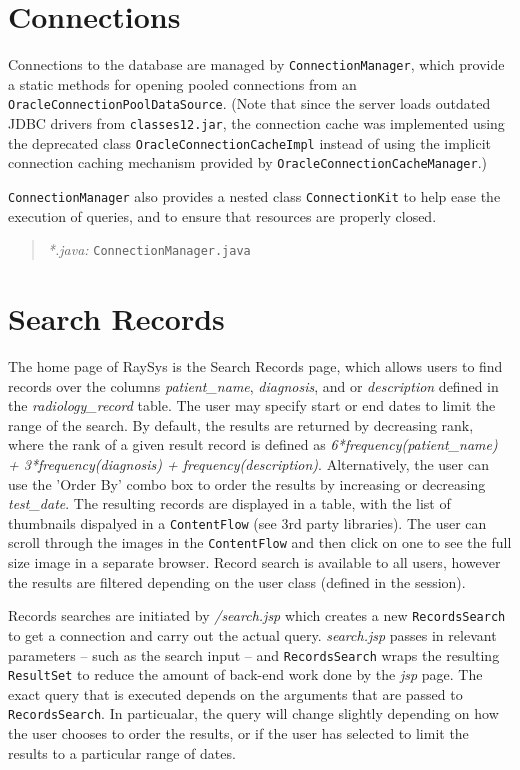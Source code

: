 \documentclass[12pt]{report}
\begin{document}
\section*{Connections}
Connections to the database are managed by \texttt{ConnectionManager}, which provide a static methods for opening pooled connections from an \texttt{OracleConnectionPoolDataSource}. (Note that since the server loads outdated JDBC drivers from \texttt{classes12.jar}, the connection cache was implemented using the deprecated class \texttt{OracleConnectionCacheImpl} instead of using the implicit connection caching mechanism provided by \texttt{OracleConnectionCacheManager}.)

\texttt{ConnectionManager} also provides a nested class \texttt{ConnectionKit} to help ease the execution of queries, and to ensure that resources are properly closed.

\begin{quote}
\emph{*.java: } \texttt{ConnectionManager.java}\\
\end{quote}
\section*{Search Records}
The home page of RaySys is the Search Records page, which allows users to find records over the columns \emph{patient\_name}, \emph{diagnosis}, and or \emph{description} defined in the \emph{radiology\_record} table. The user may specify start or end dates to limit the range of the search. By default, the results are returned by decreasing rank, where the rank of a given result record is defined as \emph{6*frequency(patient\_name) + 3*frequency(diagnosis) + frequency(description)}. Alternatively, the user can use the 'Order By' combo box to order the results by increasing or decreasing \emph{test\_date}. The resulting records are displayed in a table, with the list of thumbnails dispalyed in a \texttt{ContentFlow} (see 3rd party libraries). The user can scroll through the images in the \texttt{ContentFlow} and then click on one to see the full size image in a separate browser. Record search is available to all users, however the results are filtered depending on the user class (defined in the session).

Records searches are initiated by \emph{/search.jsp} which creates a new \texttt{RecordsSearch} to get a connection and carry out the actual query. \emph{search.jsp} passes in relevant parameters -- such as the search input -- and \texttt{RecordsSearch} wraps the resulting \texttt{ResultSet} to reduce the amount of back-end work done by the \emph{jsp} page. The exact query that is executed depends on the arguments that are passed to \texttt{RecordsSearch}. In particualar, the query will change slightly depending on how the user chooses to order the results, or if the user has selected to limit the results to a particular range of dates.
\end{document}
